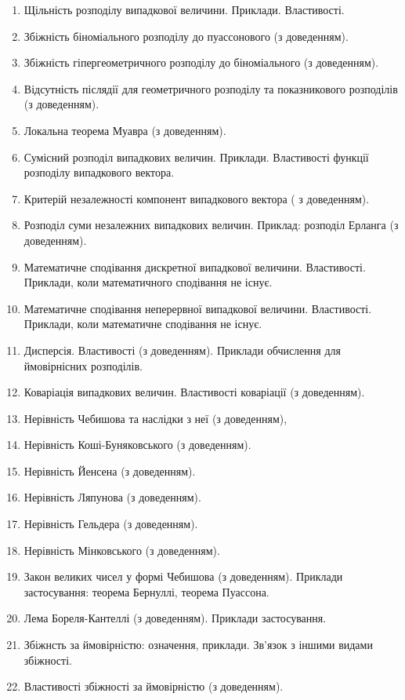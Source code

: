\begin{enumerate}
    \item Щільність розподілу випадкової величини. Приклади. Властивості.
    \item Збіжність біноміального розподілу до пуассонового (з доведенням).
    \item Збіжність гіпергеометричного розподілу до біноміального (з доведенням).
    \item Відсутність післядії для геометричного розподілу та показникового розподілів (з
        доведенням).
    \item Локальна теорема Муавра (з доведенням).
    \item Сумісний розподіл випадкових величин. Приклади. Властивості функції
        розподілу випадкового вектора.
    \item Критерій незалежності компонент випадкового вектора ( з доведенням).
    \item Розподіл суми незалежних випадкових величин. Приклад: розподіл Ерланга (з
        доведенням).
    \item Математичне сподівання дискретної випадкової величини. Властивості.
        Приклади, коли математичного сподівання не існує.
    \item Математичне сподівання неперервної випадкової величини. Властивості.
        Приклади, коли математичне сподівання не існує.
    \item Дисперсія. Властивості (з доведенням). Приклади обчислення для ймовірнісних
        розподілів.
    \item Коваріація випадкових величин. Властивості коваріації (з доведенням).
    \item Нерівність Чебишова та наслідки з неї (з доведенням),
    \item Нерівність Коші-Буняковського (з доведенням).
    \item Нерівність Йенсена (з доведенням).
    \item Нерівність Ляпунова (з доведенням).
    \item Нерівність Гельдера (з доведенням).
    \item Нерівність Мінковського (з доведенням).
    \item Закон великих чисел у формі Чебишова (з доведенням). Приклади застосування:
        теорема Бернуллі, теорема Пуассона.
    \item Лема Бореля-Кантеллі (з доведенням). Приклади застосування.
    \item Збіжнсть за ймовірністю: означення, приклади. Зв'язок з іншими видами
        збіжності.
    \item Властивості збіжності за ймовірністю (з доведенням).

\end{enumerate}
